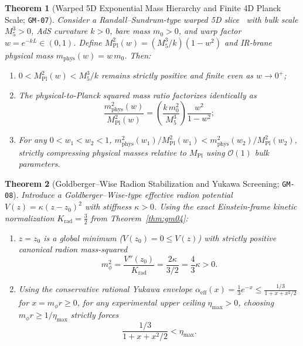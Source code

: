 \documentclass[11pt,a4paper]{article}
\theoremstyle{plain}
\newtheorem{theorem}{Theorem}[section]
\theoremstyle{remark}
\newcommand{\code}[1]{\texttt{\small #1}}
\begin{document}
\begin{theorem}[Warped 5D Exponential Mass Hierarchy and Finite 4D Planck Scale; \code{GM-07}]
\label{thm:gm07}
Consider a Randall--Sundrum-type warped 5D slice~\cite{RandallSundrum1999} with bulk scale $M_5^3 > 0$, AdS curvature $k > 0$, bare mass $m_0 > 0$, and warp factor $w = e^{-kL} \in (0,1)$. Define $M_{\mathrm{Pl}}^2(w) = (M_5^3/k)(1 - w^2)$ and IR-brane physical mass $m_{\mathrm{phys}}(w) = w\,m_0$. Then:
\begin{enumerate}
  \item $0 < M_{\mathrm{Pl}}^2(w) < M_5^3/k$ remains strictly positive and finite even as $w \to 0^+$;
  \item The physical-to-Planck squared mass ratio factorizes identically as
  \begin{equation}
    \frac{m_{\mathrm{phys}}^2(w)}{M_{\mathrm{Pl}}^2(w)}
    = \left(\frac{k\,m_0^2}{M_5^3}\right) \frac{w^2}{1 - w^2};
  \end{equation}
  \item For any $0 < w_1 < w_2 < 1$, $m_{\mathrm{phys}}^2(w_1)/M_{\mathrm{Pl}}^2(w_1) < m_{\mathrm{phys}}^2(w_2)/M_{\mathrm{Pl}}^2(w_2)$, strictly compressing physical masses relative to $M_{\mathrm{Pl}}$ using $\mathcal{O}(1)$ bulk parameters.
\end{enumerate}
\end{theorem}

\begin{theorem}[Goldberger--Wise Radion Stabilization and Yukawa Screening; \code{GM-08}]
\label{thm:gm08}
Introduce a Goldberger--Wise-type effective radion potential~\cite{GoldbergerWise1999} $V(z) = \kappa(z - z_0)^2$ with stiffness $\kappa > 0$. Using the exact Einstein-frame kinetic normalization $K_{\mathrm{rad}} = \tfrac{3}{2}$ from Theorem~\ref{thm:gm04}:
\begin{enumerate}
  \item $z = z_0$ is a global minimum ($V(z_0) = 0 \le V(z)$) with strictly positive canonical radion mass-squared
  \begin{equation}
    m_\phi^2 = \frac{V''(z_0)}{K_{\mathrm{rad}}} = \frac{2\kappa}{3/2} = \frac{4}{3}\kappa > 0.
  \end{equation}
  \item Using the conservative rational Yukawa envelope $\alpha_{\mathrm{eff}}(x) = \tfrac{1}{3}e^{-x} \le \frac{1/3}{1 + x + x^2/2}$ for $x = m_\phi r \ge 0$, for \emph{any} experimental upper ceiling $\eta_{\max} > 0$, choosing $m_\phi r \ge 1/\eta_{\max}$ strictly forces
  \begin{equation}
    \frac{1/3}{1 + x + x^2/2} < \eta_{\max}.
  \end{equation}
\end{enumerate}
\end{theorem}
\end{document}
